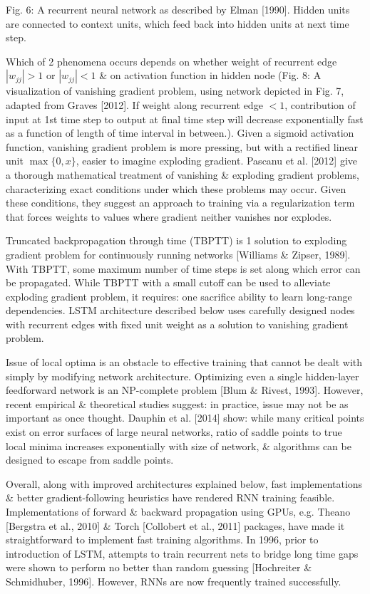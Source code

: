 \documentclass{article}
\begin{document}
\begin{enumerate}
\begin{itemize}
\begin{itemize}
			{\sf Fig. 6: A recurrent neural network as described by Elman [1990]. Hidden units are connected to context units, which feed back into hidden units at next time step.}
			
			Which of 2 phenomena occurs depends on whether weight of recurrent edge $|w_{jj}| > 1$ or $|w_{jj}| < 1$ \& on activation function in hidden node ({\sf Fig. 8: A visualization of vanishing gradient problem, using network depicted in Fig. 7, adapted from Graves [2012]. If weight along recurrent edge $< 1$, contribution of input at 1st time step to output at final time step will decrease exponentially fast as a function of length of time interval in between.}). Given a sigmoid activation function, vanishing gradient problem is more pressing, but with a rectified linear unit $\max\{0,x\}$, easier to imagine exploding gradient. Pascanu et al. [2012] give a thorough mathematical treatment of vanishing \& exploding gradient problems, characterizing exact conditions under which these problems may occur. Given these conditions, they suggest an approach to training via a regularization term that forces weights to values where gradient neither vanishes nor explodes.
			
			Truncated backpropagation through time (TBPTT) is 1 solution to exploding gradient problem for continuously running networks [Williams \& Zipser, 1989]. With TBPTT, some maximum number of time steps is set along which error can be propagated. While TBPTT with a small cutoff can be used to alleviate exploding gradient problem, it requires: one sacrifice ability to learn long-range dependencies. LSTM architecture described below uses carefully designed nodes with recurrent edges with fixed unit weight as a solution to vanishing gradient problem.
			
			Issue of local optima is an obstacle to effective training that cannot be dealt with simply by modifying network architecture. Optimizing even a single hidden-layer feedforward network is an NP-complete problem [Blum \& Rivest, 1993]. However, recent empirical \& theoretical studies suggest: in practice, issue may not be as important as once thought. Dauphin et al. [2014] show: while many critical points exist on error surfaces of large neural networks, ratio of saddle points to true local minima increases exponentially with size of network, \& algorithms can be designed to escape from saddle points.
			
			Overall, along with improved architectures explained below, fast implementations \& better gradient-following heuristics have rendered RNN training feasible. Implementations of forward \& backward propagation using GPUs, e.g. Theano [Bergstra et al., 2010] \& Torch [Collobert et al., 2011] packages, have made it straightforward to implement fast training algorithms.  In 1996, prior to introduction of LSTM, attempts to train recurrent nets to bridge long time gaps were shown to perform no better than random guessing [Hochreiter \& Schmidhuber, 1996]. However, RNNs are now frequently trained successfully.
			

\end{itemize}
\end{itemize}
\end{enumerate}
\end{document}
